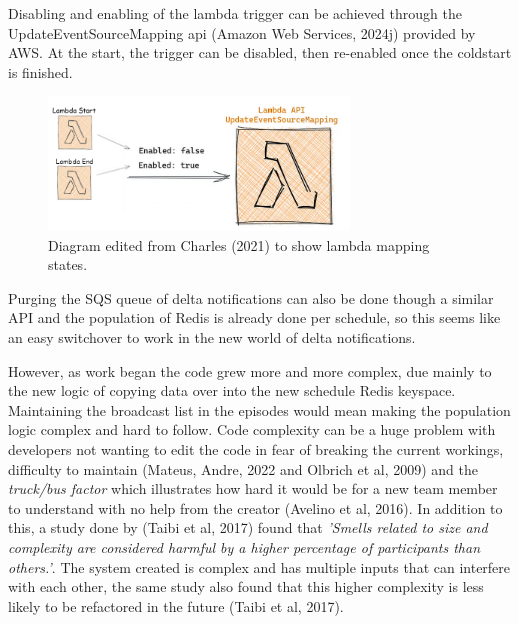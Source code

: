   Disabling and enabling of the lambda trigger can be achieved through the UpdateEventSourceMapping api (Amazon Web Services, 2024j) provided by AWS. 
  At the start, the trigger can be disabled, then re-enabled once the coldstart is finished.

  \begin{figure}[H]
    \centering
    \includegraphics[width=8cm]{assets/lambdaMapping.png}
    \caption{Diagram edited from Charles (2021) to show lambda mapping states.}
    \label{fig:lambdaMapping}
  \end{figure}

  Purging the SQS queue of delta notifications can also be done though a similar API and the population of Redis is already done per schedule, so 
  this seems like an easy switchover to work in the new world of delta notifications.

  However, as work began the code grew more and more complex, due mainly to the new logic of copying data over into the new schedule Redis keyspace.
  Maintaining the broadcast list in the episodes would mean making the population logic complex and hard to follow. Code complexity can be a huge 
  problem with developers not wanting to edit the code in fear of breaking the current workings, difficulty to maintain 
  (Mateus, Andre, 2022 and Olbrich et al, 2009) and the \textit{truck/bus factor} which illustrates how hard it would be for a new team member to 
  understand with no help from the creator (Avelino et al, 2016). In addition to this, a study done by (Taibi et al, 2017) found that 
  \textit{'Smells related to size and complexity are considered harmful by a higher percentage of participants than others.'}. The system created is 
  complex and has multiple inputs that can interfere with each other, the same study also found that this higher complexity is less likely to be 
  refactored in the future (Taibi et al, 2017).

